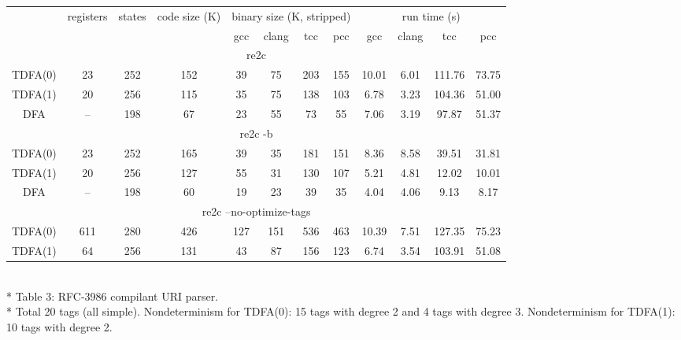\documentclass{article}
\theoremstyle{definition}
\begin{document}
\begin{center}
    \bigskip
    \begin{tabular}{|c|ccccccccccc|}
    \hline
    & registers & states & code size (K) & \multicolumn{4}{c}{binary size (K, stripped)} & \multicolumn{4}{c|}{run time (s)} \\
    & & &
        & gcc & clang & tcc & pcc
        & gcc & clang & tcc & pcc \\
    \hline \hline
    \multicolumn{12}{|c|}{re2c} \\
    \hline
    TDFA(0) & 23 & 252 & 152 & 39 & 75 & 203 & 155 & 10.01 & 6.01 & 111.76 & 73.75 \\
    TDFA(1) & 20 & 256 & 115 & 35 & 75 & 138 & 103 &  6.78 & 3.23 & 104.36 & 51.00 \\
    DFA     & -- & 198 &  67 & 23 & 55 &  73 &  55 &  7.06 & 3.19 &  97.87 & 51.37 \\
    \hline \hline
    \multicolumn{12}{|c|}{re2c -b} \\
    \hline
    TDFA(0) & 23 & 252 & 165 & 39 & 35 & 181 & 151 & 8.36 & 8.58 & 39.51 & 31.81 \\
    TDFA(1) & 20 & 256 & 127 & 55 & 31 & 130 & 107 & 5.21 & 4.81 & 12.02 & 10.01 \\
    DFA     & -- & 198 &  60 & 19 & 23 &  39 &  35 & 4.04 & 4.06 &  9.13 &  8.17 \\
    \hline \hline
    \multicolumn{12}{|c|}{re2c --no-optimize-tags} \\
    \hline
    TDFA(0) & 611 & 280 & 426 & 127 & 151 & 536 & 463 & 10.39 & 7.51 & 127.35 & 75.23 \\
    TDFA(1) &  64 & 256 & 131 &  43 &  87 & 156 & 123 &  6.74 & 3.54 & 103.91 & 51.08 \\
    \hline
    \end{tabular}\\*
    \medskip
    Table 3: RFC-3986 compilant URI parser.\\*
    \medskip
    \small{Total 20 tags (all simple).
    Nondeterminism for TDFA(0): 15 tags with degree 2 and 4 tags with degree 3.
    Nondeterminism for TDFA(1): 10 tags with degree 2.}
    \bigskip
\end{center}
\end{document}
